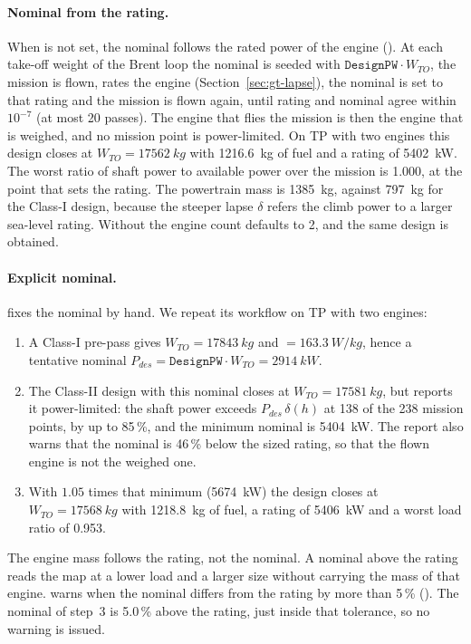 \documentclass[a4paper,11pt]{article}
\begin{document}
\paragraph{Nominal from the rating.} When  is not set, the nominal follows
the rated power of the engine (). At each take-off weight
of the Brent loop the nominal is seeded with $\texttt{DesignPW}\cdot W_{TO}$, the mission is
flown,  rates the engine (Section~\ref{sec:gt-lapse}), the nominal is
set to that rating and the mission is flown again, until rating and nominal agree within
$10^{-7}$ (at most 20 passes). The engine that flies the mission is then the engine that is
weighed, and no mission point is power-limited. On TP with two engines this design closes at
$W_{TO} = \SI{17562}{kg}$ with \SI{1216.6}{kg} of fuel and a rating of \SI{5402}{kW}. The worst
ratio of shaft power to available power over the mission is 1.000, at the point that sets the
rating. The powertrain mass is \SI{1385}{kg}, against \SI{797}{kg} for the Class-I design, because
the steeper lapse $\delta$ refers the climb power to a larger sea-level rating. Without
 the engine count defaults to 2, and the same design is obtained.

\paragraph{Explicit nominal.}  fixes the
nominal by hand. We repeat its workflow on TP with two engines:
\begin{enumerate}
\item A Class-I pre-pass gives $W_{TO} = \SI{17843}{kg}$ and  $=
  \SI{163.3}{W/kg}$, hence a tentative nominal $P_{des} = \texttt{DesignPW}\cdot W_{TO} =
  \SI{2914}{kW}$.
\item The Class-II design with this nominal closes at $W_{TO} = \SI{17581}{kg}$, but
   reports it power-limited: the shaft power exceeds
  $P_{des}\,\delta(h)$ at 138 of the 238 mission points, by up to 85\,\%, and the minimum
  nominal is \SI{5404}{kW}. The report also warns that the nominal is 46\,\% below the sized
  rating, so that the flown engine is not the weighed one.
\item With $1.05$ times that minimum (\SI{5674}{kW}) the design closes at
  $W_{TO} = \SI{17568}{kg}$ with \SI{1218.8}{kg} of fuel, a rating of \SI{5406}{kW} and a worst
  load ratio of 0.953.
\end{enumerate}
The engine mass follows the rating, not the nominal. A nominal above the rating reads the map at
a lower load and a larger size without carrying the mass of that engine.
 warns when the nominal differs from the rating by more than 5\,\%
(). The nominal of step~3 is 5.0\,\% above the rating, just inside
that tolerance, so no warning is issued.
\end{document}
